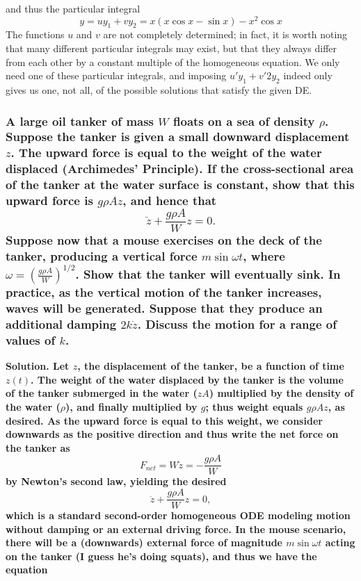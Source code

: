 \documentclass{article}
\begin{document}
and thus the particular integral
\begin{equation*}
    y = uy_1 + vy_2 = x(x\cos x - \sin x) - x^2\cos x
\end{equation*}
The functions $u$ and $v$ are not completely determined; in fact, it is worth noting that many different particular integrals may exist, but that they always differ from each other by a constant multiple of the homogeneous equation. We only need one of these particular integrals, and imposing $u'y_1 + v'2y_2$ indeed only gives us one, not all, of the possible solutions that satisfy the given DE.

\hrulefill

\subsubsection*{A large oil tanker of mass $W$ floats on a sea of density $\rho$. Suppose the tanker is given a small downward displacement $z$. The upward force is equal to the weight of the water displaced (Archimedes' Principle). If the cross-sectional area of the tanker at the water surface is constant, show that this upward force is $g\rho A z$, and hence that 
\begin{equation*}
    \ddot{z} + \frac{g\rho A }{W} z = 0.
\end{equation*}
Suppose now that a mouse exercises on the deck of the tanker, producing a vertical force $m \sin \omega t$, where $\omega = (\frac{g\rho A}{W})^{1/2}$. Show that the tanker will eventually sink. In practice, as the vertical motion of the tanker increases, waves will be generated. Suppose that they produce an additional damping $2k\dot{z}$. Discuss the motion for a range of values of $k$.}
\bf Solution. \normalfont Let $z$, the displacement of the tanker, be a function of time $z(t)$. The weight of the water displaced by the tanker is the volume of the tanker submerged in the water ($zA$) multiplied by the density of the water ($\rho$), and finally multiplied by $g$; thus weight equals $g\rho Az$, as desired. As the upward force is equal to this weight, we consider downwards as the positive direction and thus write the net force on the tanker as 
\begin{equation*}
    F_{net} = W\ddot{z} = -\frac{g\rho A}{W}
\end{equation*}
by Newton's second law, yielding the desired
\begin{equation*}
    \ddot{z} + \frac{g\rho A }{W} z = 0,
\end{equation*}
which is a standard second-order homogeneous ODE modeling motion without damping or an external driving force. In the mouse scenario, there will be a (downwards) external force of magnitude $m\sin \omega t$ acting on the tanker (I guess he's doing squats), and thus we have the equation
\end{document}

